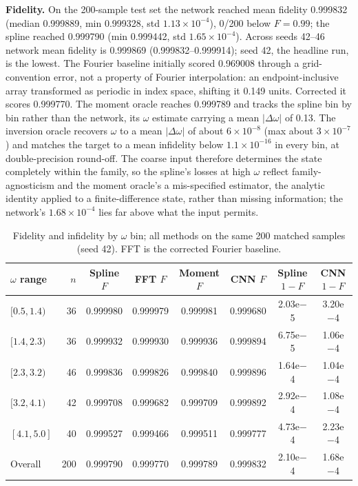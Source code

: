 \documentclass{article}
\begin{document}
\textbf{Fidelity.} On the 200-sample test set the network reached mean fidelity
0.999832 (median 0.999889, min 0.999328, std $1.13 \times 10^{-4}$), 0/200 below
$F = 0.99$; the spline reached 0.999790 (min 0.999442, std
$1.65 \times 10^{-4}$). Across seeds 42--46 network mean fidelity is 0.999869
(0.999832--0.999914); seed 42, the headline run, is the lowest.
The Fourier baseline initially scored 0.969008 through a grid-convention error,
not a property of Fourier interpolation: an endpoint-inclusive array transformed
as periodic in index space, shifting it 0.149 units. Corrected it scores
0.999770. The moment oracle
reaches 0.999789 and tracks the spline bin by bin rather than the network, its
$\omega$ estimate carrying a mean $|\Delta\omega|$ of 0.13. The inversion oracle
recovers $\omega$ to a mean $|\Delta\omega|$ of about $6 \times 10^{-8}$ (max
about $3 \times 10^{-7}$) and matches the target to a mean
infidelity below $1.1 \times 10^{-16}$ in every bin, at double-precision
round-off. The coarse input therefore determines the state completely within the
family, so the spline's losses at high $\omega$ reflect family-agnosticism and
the moment oracle's a mis-specified estimator, the analytic identity applied to a
finite-difference state, rather than missing information; the network's
$1.68 \times 10^{-4}$ lies far above what the input permits.

\begin{table}[t]
  \centering
  \caption{Fidelity and infidelity by $\omega$ bin; all methods on the same 200
  matched samples (seed 42). FFT is the corrected Fourier baseline.}
  \label{tab:bins}
  \footnotesize
  \setlength{\tabcolsep}{4pt}
  \begin{tabular}{lrcccccc}
    \toprule
    $\omega$ range & $n$ & Spline $F$ & FFT $F$ & Moment $F$ & CNN $F$ &
    Spline $1-F$ & CNN $1-F$ \\
    \midrule
    $[0.5, 1.4)$ & 36 & 0.999980 & 0.999979 & 0.999981 & 0.999680 & 2.03e$-$5 & 3.20e$-$4 \\
    $[1.4, 2.3)$ & 36 & 0.999932 & 0.999930 & 0.999936 & 0.999894 & 6.75e$-$5 & 1.06e$-$4 \\
    $[2.3, 3.2)$ & 46 & 0.999836 & 0.999826 & 0.999840 & 0.999896 & 1.64e$-$4 & 1.04e$-$4 \\
    $[3.2, 4.1)$ & 42 & 0.999708 & 0.999682 & 0.999709 & 0.999892 & 2.92e$-$4 & 1.08e$-$4 \\
    $[4.1, 5.0]$ & 40 & 0.999527 & 0.999466 & 0.999511 & 0.999777 & 4.73e$-$4 & 2.23e$-$4 \\
    \midrule
    Overall & 200 & 0.999790 & 0.999770 & 0.999789 & 0.999832 & 2.10e$-$4 & 1.68e$-$4 \\
    \bottomrule
  \end{tabular}
\end{table}
\end{document}
